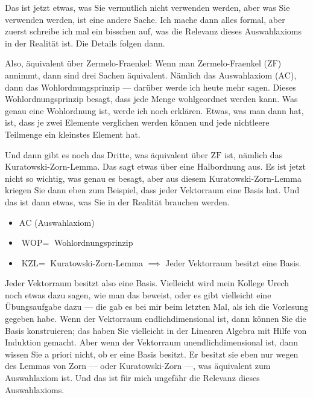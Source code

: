 \begin{spoken-clean}[00:07:30 - 00:09:45]
Das ist jetzt etwas, was Sie vermutlich nicht verwenden werden, aber was Sie verwenden werden, ist eine andere Sache. Ich mache dann alles formal, aber zuerst schreibe ich mal ein bisschen auf, was die Relevanz dieses Auswahlaxioms in der Realität ist. Die Details folgen dann. 

Also, äquivalent über Zermelo-Fraenkel: Wenn man Zermelo-Fraenkel ($\text{ZF}$) annimmt, dann sind drei Sachen äquivalent. Nämlich das Auswahlaxiom ($\text{AC}$), dann das Wohlordnungsprinzip --- darüber werde ich heute mehr sagen. Dieses Wohlordnungsprinzip besagt, dass jede Menge wohlgeordnet werden kann. Was genau eine Wohlordnung ist, werde ich noch erklären. Etwas, was man dann hat, ist, dass je zwei Elemente verglichen werden können und jede nichtleere Teilmenge ein kleinstes Element hat. 

Und dann gibt es noch das Dritte, was äquivalent über $\text{ZF}$ ist, nämlich das Kuratowski-Zorn-Lemma. Das sagt etwas über eine Halbordnung aus. Es ist jetzt nicht so wichtig, was genau es besagt, aber aus diesem Kuratowski-Zorn-Lemma kriegen Sie dann eben zum Beispiel, dass jeder Vektorraum eine Basis hat. Und das ist dann etwas, was Sie in der Realität brauchen werden.
\end{spoken-clean}

\begin{math-stroke}
\begin{itemize}
    \item $\text{AC}$ (Auswahlaxiom)
    \item $\text{WOP} =$ Wohlordnungsprinzip
    \item $\text{KZL} =$ Kuratowski-Zorn-Lemma $\implies$ Jeder Vektorraum besitzt eine Basis.
\end{itemize}
\end{math-stroke}

\begin{spoken-clean}[00:09:45 - 00:10:15]
Jeder Vektorraum besitzt also eine Basis. Vielleicht wird mein Kollege Urech noch etwas dazu sagen, wie man das beweist, oder es gibt vielleicht eine Übungsaufgabe dazu --- die gab es bei mir beim letzten Mal, als ich die Vorlesung gegeben habe. Wenn der Vektorraum endlichdimensional ist, dann können Sie die Basis konstruieren; das haben Sie vielleicht in der Linearen Algebra mit Hilfe von Induktion gemacht. Aber wenn der Vektorraum unendlichdimensional ist, dann wissen Sie a priori nicht, ob er eine Basis besitzt. Er besitzt sie eben nur wegen des Lemmas von Zorn --- oder Kuratowski-Zorn ---, was äquivalent zum Auswahlaxiom ist. Und das ist für mich ungefähr die Relevanz dieses Auswahlaxioms.
\end{spoken-clean}

